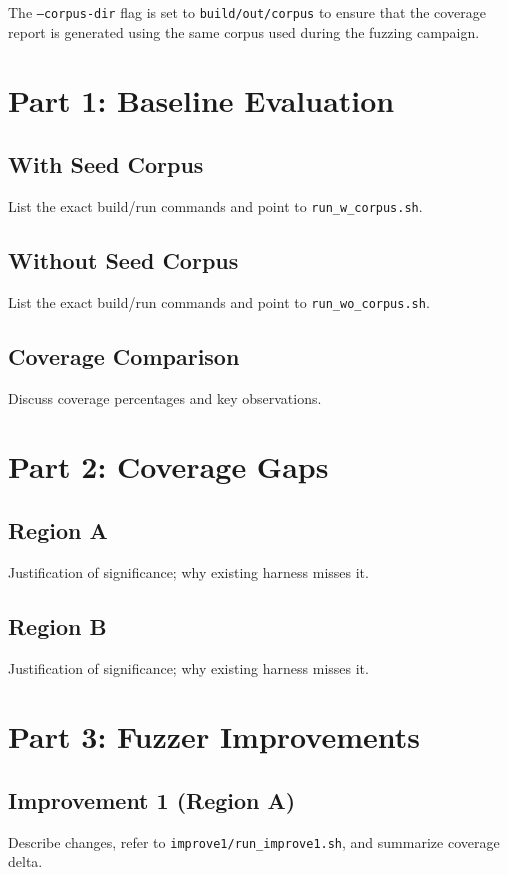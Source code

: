 \documentclass[11pt,a4paper,twocolumn]{article}
\begin{document}
The \texttt{---corpus-dir} flag is set to \texttt{build/out/corpus} to ensure that the coverage report is generated using the same corpus used during the fuzzing campaign.

\section{Part 1: Baseline Evaluation}

\subsection{With Seed Corpus}

List the exact build/run commands and point to \texttt{run\_w\_corpus.sh}.

\subsection{Without Seed Corpus}
List the exact build/run commands and point to \texttt{run\_wo\_corpus.sh}.

\subsection{Coverage Comparison}
Discuss coverage percentages and key observations.

\section{Part 2: Coverage Gaps}

\subsection{Region A}
Justification of significance; why existing harness misses it.

\subsection{Region B}
Justification of significance; why existing harness misses it.

\section{Part 3: Fuzzer Improvements}

\subsection{Improvement 1 (Region A)}
Describe changes, refer to \texttt{improve1/run\_improve1.sh}, and summarize coverage delta.
\end{document}
